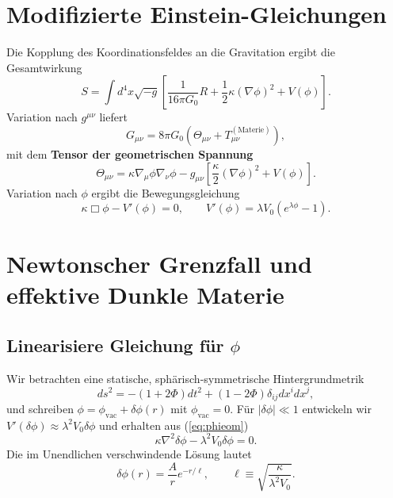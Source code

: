 \documentclass[12pt,a4paper]{article}
\begin{document}
	\section{Modifizierte Einstein-Gleichungen}
	
	Die Kopplung des Koordinationsfeldes an die Gravitation ergibt die Gesamtwirkung
	\begin{equation}
		S = \int d^4x \sqrt{-g} \left[ \frac{1}{16\pi G_0} R + \frac{1}{2}\kappa (\nabla\phi)^2 + V(\phi) \right].
		\label{eq:action}
	\end{equation}
	Variation nach \(g^{\mu\nu}\) liefert
	\begin{equation}
		G_{\mu\nu} = 8\pi G_0 \left( \Theta_{\mu\nu} + T_{\mu\nu}^{(\mathrm{Materie})} \right),
		\label{eq:einstein}
	\end{equation}
	mit dem \textbf{Tensor der geometrischen Spannung}
	\begin{equation}
		\Theta_{\mu\nu} = \kappa \nabla_\mu \phi \nabla_\nu \phi - g_{\mu\nu} \left[ \frac{\kappa}{2} (\nabla\phi)^2 + V(\phi) \right].
		\label{eq:Theta}
	\end{equation}
	Variation nach \(\phi\) ergibt die Bewegungsgleichung
	\begin{equation}
		\kappa \Box \phi - V'(\phi) = 0, \qquad V'(\phi) = \lambda V_0 \left( e^{\lambda\phi} - 1 \right).
		\label{eq:phieom}
	\end{equation}
	
	\section{Newtonscher Grenzfall und effektive Dunkle Materie}
	
	\subsection{Linearisiere Gleichung für \(\phi\)}
	Wir betrachten eine statische, sphärisch-symmetrische Hintergrundmetrik
	\[
	ds^2 = -(1+2\Phi)dt^2 + (1-2\Phi)\delta_{ij}dx^i dx^j,
	\]
	und schreiben \(\phi = \phi_{\mathrm{vac}} + \delta\phi(r)\) mit \(\phi_{\mathrm{vac}} = 0\). Für \(|\delta\phi| \ll 1\) entwickeln wir \(V'(\delta\phi) \approx \lambda^2 V_0 \delta\phi\) und erhalten aus (\ref{eq:phieom})
	\begin{equation}
		\kappa \nabla^2 \delta\phi - \lambda^2 V_0 \delta\phi = 0.
		\label{eq:lin-phi}
	\end{equation}
	Die im Unendlichen verschwindende Lösung lautet
	\begin{equation}
		\delta\phi(r) = \frac{A}{r} e^{-r/\ell}, \qquad \ell \equiv \sqrt{\frac{\kappa}{\lambda^2 V_0}}.
		\label{eq:deltaphi-sol}
	\end{equation}
	
\end{document}
